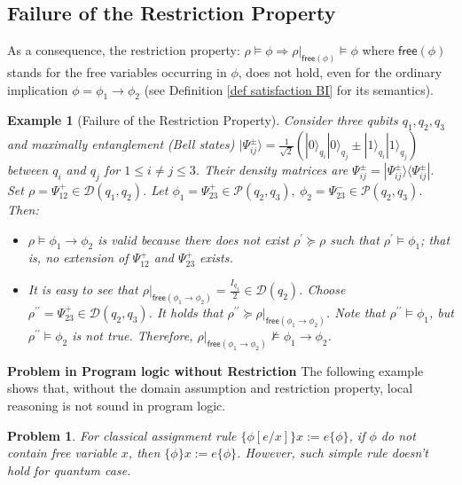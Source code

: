 \documentclass[conference,compsoc, 10pt]{IEEEtran}
\newtheorem{example}{Example}[section]
\newtheorem{problem}{Problem}[section]
\newcommand {\cD } {{\mathcal{D}}}
\newcommand {\cP } {{\mathcal{P}}}
\newcommand {\id } {{I}}
\newcommand {\LTypeF }[1] {{\mathsf{free}{\left(#1\right)}}}
\newcommand {\rt }[2] {{\left.{#1}\right|_{#2}}}
\newcommand {\V }[1] {{\mathsf{free}{\left(#1\right)}}}
\def\>{\ensuremath{\rangle}}
\def\<{\ensuremath{\langle}}
\begin{document}
\begin{appendices}
		\subsection{Failure of the Restriction Property}
		As a consequence, the restriction property: $\rho\models\phi\Rightarrow \rt{\rho}{\V{\phi}}\models\phi$ where $\V{\phi}$ stands for the free variables occurring in $\phi$, does not hold, even for the ordinary implication $\phi=\phi_1\rightarrow\phi_2$ (see Definition \ref{def satisfaction BI} for its semantics). 
		
		\begin{example}[Failure of the Restriction Property] 
			\label{exam failure restriction implication}
			Consider three qubits $q_1,q_2,q_3$ and maximally entanglement (Bell states) $|\Psi^\pm_{ij}\> =  \frac{1}{\sqrt{2}}(|0\>_{q_i}|0\>_{q_j}\pm|1\>_{q_i}|1\>_{q_j})$ between $q_i$ and $q_j$ for $1\le i\neq j\le 3$. Their density matrices are $\Psi^\pm_{ij} = |\Psi^\pm_{ij}\>\<\Psi^\pm_{ij}|.$
			Set $\rho = \Psi^+_{12}\in\cD(q_1,q_2)$. Let $\phi_1 = \Psi^+_{23}\in\cP(q_2,q_3),\ \phi_2 = \Psi^-_{23}\in\cP(q_2,q_3)$. Then: 
			\begin{itemize}
				\item $\rho\models\phi_1\rightarrow\phi_2$ is valid because there does not exist $\rho^\prime\succeq\rho$ such that $\rho^\prime\models\phi_1$; that is, no extension of $\Psi^+_{12}$ and $\Psi^+_{23}$ exists. 
				\item It is easy to see that   $\rt{\rho}{\LTypeF{\phi_1\rightarrow\phi_2}} = \frac{\id_{q_2}}{2}\in\cD(q_2)$. Choose $\rho^{\prime\prime} = \Psi^+_{23}\in\cD(q_2,q_3)$. It holds that $\rho^{\prime\prime}\succeq\rt{\rho}{\LTypeF{\phi_1\rightarrow\phi_2}}$. Note that $\rho^{\prime\prime}\models\phi_1$, but $\rho^{\prime\prime}\models\phi_2$ is not true. Therefore, $\rt{\rho}{\LTypeF{\phi_1\rightarrow\phi_2}}\not\models\phi_1\rightarrow\phi_2$.\end{itemize}
		\end{example}
		
		\vspace{0.5cm}
		
		\noindent\textbf{Problem in Program logic without Restriction} The following example shows that, without the domain assumption and restriction property, local reasoning is not sound in program logic.
		\begin{problem}
			For classical assignment rule $\{\phi[e/x]\}x:=e\{\phi\}$, if $\phi$ do not contain free variable $x$, then $\{\phi\}x:=e\{\phi\}$. However, such simple rule doesn't hold for quantum case.
			

\end{problem}
\end{appendices}
\end{document}
